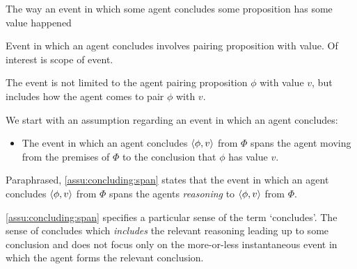 \begin{note}
  The way an event in which some agent concludes some proposition has some value happened

  Event in which an agent concludes involves pairing proposition with value.
  Of interest is scope of event.

  The event is not limited to the agent pairing proposition \(\phi\) with value \(v\), but includes how the agent comes to pair \(\phi\) with \(v\).
\end{note}

\begin{note}
  We start with an assumption regarding an event in which an agent concludes:

  \begin{specification}
    \label{assu:concluding:span}

    \begin{itemize}
    \item
      The event in which an agent concludes \(\langle \phi, v \rangle\) from \(\Phi\) spans the agent moving from the premises of \(\Phi\) to the conclusion that \(\phi\) has value \(v\).
    \end{itemize}
    \vspace{-\baselineskip}
  \end{specification}

  Paraphrased, \autoref{assu:concluding:span} states that the event in which an agent concludes \(\langle \phi, v \rangle\) from \(\Phi\) spans the agents \emph{reasoning} to \(\langle \phi, v \rangle\) from \(\Phi\).
\end{note}

\begin{note}
  \autoref{assu:concluding:span} specifies a particular sense of the term `concludes'.
  The sense of concludes which \emph{includes} the relevant reasoning leading up to some conclusion and does not focus only on the more-or-less instantaneous event in which the agent forms the relevant conclusion.
\end{note}

